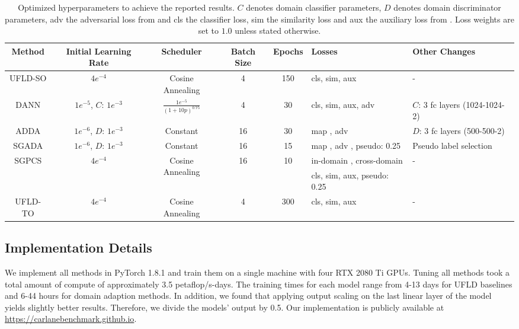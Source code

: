 \documentclass{article}
\begin{document}
	\begin{table}
		\caption{Optimized hyperparameters to achieve the reported results. $C$ denotes domain classifier parameters, $D$ denotes domain discriminator parameters, adv the adversarial loss from \cite{Tzeng2017ADDA} and cls the classifier loss, sim the similarity loss and aux the auxiliary loss from \cite{qin2020ultra}. Loss weights are set to $1.0$ unless stated otherwise.}
		\label{table:Hyperpparameters}
		\tiny
		\centering
		\begin{tabular}{cccccll}
			\toprule
			Method  	& Initial Learning Rate    	             & Scheduler     & Batch Size  & Epochs    &Losses    & Other Changes \\   
			\midrule	
			UFLD-SO                &$4e^{-4}$                 & Cosine Annealing           & 4           &150  & cls, sim, aux & - \\       
			DANN                   & $1e^{-5}$, $C$: $1e^{-3}$   & $\frac{1e^{-5}}{(1 + 10p)^{0.75}}$   & 4  & 30 & cls, sim, aux, adv \cite{Ganin2016}  & $C$: 3 fc layers (1024-1024-2)  \\   ADDA                    & $1e^{-6}$, $D$: $1e^{-3}$  & Constant           & 16          & 30 & map \cite{Tzeng2017ADDA}, adv \cite{Tzeng2017ADDA}& $D$: 3 fc layers (500-500-2) \\    SGADA                   & $1e^{-6}$, $D$: $1e^{-3}$  & Constant           & 16          & 15 &  map \cite{Tzeng2017ADDA}, adv \cite{Tzeng2017ADDA}, pseudo: 0.25  & Pseudo label selection \\
			\multirow{2}{*}{SGPCS}  &\multirow{2}{*}{$4e^{-4}$} & \multirow{2}{*}{Cosine Annealing} & \multirow{2}{*}{16} & \multirow{2}{*}{10} & in-domain \cite{yue2021prototypical}, cross-domain \cite{yue2021prototypical} & \multirow{2}{*}{-} \\
			&&&&& cls, sim, aux, pseudo: 0.25 & \\
			UFLD-TO                   &$4e^{-4}$  & Cosine Annealing           & 4          & 300 & cls, sim, aux & - \\	   
			\bottomrule	
		\end{tabular}
	\end{table}
	
	\subsection{Implementation Details}
	\label{sec:ImplementationDetails}
We implement all methods in PyTorch 1.8.1 and train them on a single machine with four RTX 2080 Ti GPUs. Tuning all methods took a total amount of compute of approximately 3.5 petaflop/s-days. The training times for each model range from 4-13 days for UFLD baselines and 6-44 hours for domain adaption methods. In addition, we found that applying output scaling on the last linear layer of the model yields slightly better results. Therefore, we divide the models' output by 0.5. Our implementation is publicly available at \href{https://carlanebenchmark.github.io}{https://carlanebenchmark.github.io}.
	
\end{document}
